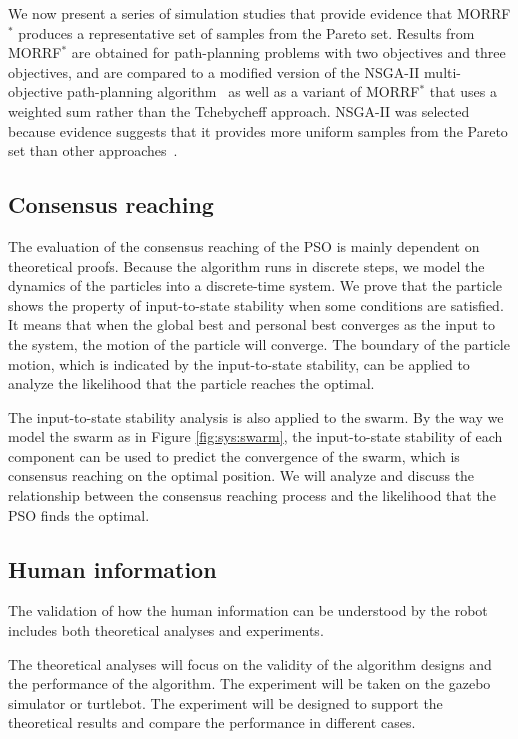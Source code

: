 \documentclass[phd]{byuprop}
\begin{document}
We now present a series of simulation studies that provide evidence that MORRF$^{*}$ produces a representative set of samples from the Pareto set.
Results from MORRF$^{*}$ are obtained for path-planning problems with two objectives and three objectives, and are compared to a modified version of the NSGA-II multi-objective path-planning algorithm~\cite{Ahmed2013} as well as a variant of MORRF$^{*}$ that uses a weighted sum rather than the Tchebycheff approach.
NSGA-II was selected because evidence suggests that it provides more uniform samples from the Pareto set than other approaches~\cite{Deb2002}.  

\subsection{Consensus reaching}

The evaluation of the consensus reaching of the PSO is mainly dependent on theoretical proofs.
Because the algorithm runs in discrete steps, we model the dynamics of the particles into a discrete-time system.
We prove that the particle shows the property of input-to-state stability when some conditions are satisfied.
It means that when the global best and personal best converges as the input to the system, the motion of the particle will converge.
The boundary of the particle motion, which is indicated by the input-to-state stability, can be applied to analyze the likelihood that the particle reaches the optimal.

The input-to-state stability analysis is also applied to the swarm.
By the way we model the swarm as in Figure \ref{fig:sys:swarm}, the input-to-state stability of each component can be used to predict the convergence of the swarm, which is consensus reaching on the optimal position.
We will analyze and discuss the relationship between the consensus reaching process and the likelihood that the PSO finds the optimal.


\subsection{Human information}

The validation of how the human information can be understood by the robot includes both theoretical analyses and experiments.

The theoretical analyses will focus on the validity of the algorithm designs and the performance of the algorithm.
The experiment will be taken on the gazebo simulator or turtlebot.
The experiment will be designed to support the theoretical results and compare the performance in different cases.
\end{document}
